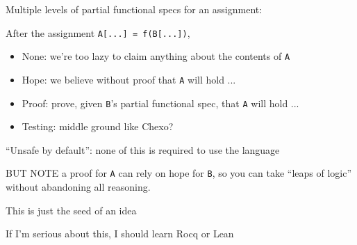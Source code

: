 \newpage
{}

{\LARGE

Multiple levels of partial functional specs for an assignment:

\begin{centering}

    After the assignment \texttt{A[...] = f(B[...])},

\end{centering}

\begin{itemize}
  \item None: we're too lazy to claim anything about the contents of \texttt{A}
  \item Hope: we believe without proof that \texttt{A} will hold ...
  \item Proof: prove, given \texttt{B}'s partial functional spec, that \texttt{A} will hold ...
  \item Testing: middle ground like Chexo?
\end{itemize}

\vfill

``Unsafe by default'': none of this is required to use the language

\vfill

BUT NOTE a proof for \texttt{A} can rely on hope for \texttt{B}, so you can take ``leaps of logic'' without abandoning all reasoning.

\vfill

}

\newpage
{}

{\LARGE

This is just the seed of an idea

If I'm serious about this, I should learn Rocq or Lean

\vfill





}

